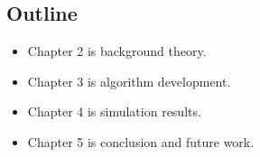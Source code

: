 \subsection{Outline}
\begin{itemize}
    \item Chapter 2 is background theory.
    \item Chapter 3 is algorithm development.
    \item Chapter 4 is simulation results.
    \item Chapter 5 is conclusion and future work.
\end{itemize}


\newpage